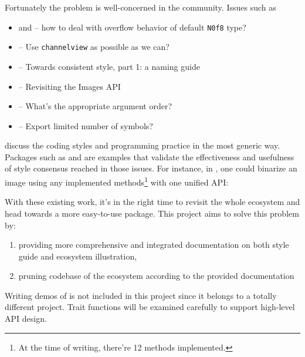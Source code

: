 Fortunately the problem is well-concerned in the community. Issues such as
\begin{itemize}
    \item {} and  -- how to deal with overflow behavior of default \texttt{N0f8} type?
    \item {} -- Use \texttt{channelview} as possible as we can?
    \item {} -- Towards consistent style, part 1: a naming guide
    \item {} -- Revisiting the Images API
    \item {} -- What's the appropriate argument order?
    \item {} -- Export limited number of symbols?
\end{itemize}
discuss the coding styles and programming practice in the most generic way. Packages such as \repohistogramthresholding and \repoimagebinarization are examples that validate the effectiveness and usefulness of style consensus reached in those issues. For instance, in \imagebinarization, one could binarize an image using any implemented methods\footnote{At the time of writing, there're 12 methods implemented.} with one unified API:

With these existing work, it's in the right time to revisit the whole \images{} ecosystem and head towards a more easy-to-use \images{} package. This project aims to solve this problem by:
\begin{enumerate}
    \item providing more comprehensive and integrated documentation on both style guide and ecosystem illustration,
    \item pruning codebase of the ecosystem according to the provided documentation
\end{enumerate}
Writing demos of \images{} is not included in this project since it belongs to a totally different project. Trait functions will be examined carefully to support high-level API design.

